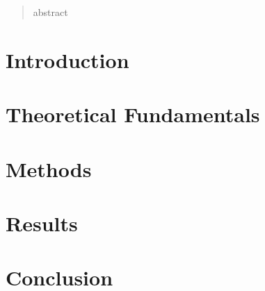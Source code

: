 \documentclass[a4paper, 10pt]{report}
\begin{document}
    


    \begin{abstract}
    abstract
    \end{abstract}

    \tableofcontents\clearpage


    \chapter{Introduction}
    

    \chapter{Theoretical Fundamentals}
    

    \chapter{Methods}
    


    \chapter{Results}
    


    \chapter{Conclusion}
    

    \listoffigures\clearpage
    \listoftables\clearpage


    \printbibliography
\end{document}
